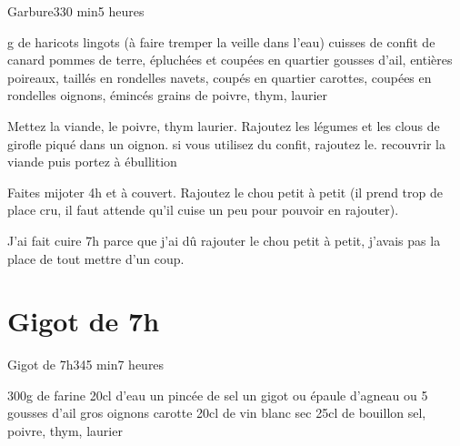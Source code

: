 {\begin{recette}{Garbure}{3}{30 min}{5 heures}
\begin{ingredients}
 g de haricots lingots (à faire tremper la veille dans l’eau) 
 cuisses de confit de canard
 pommes de terre, épluchées et coupées en quartier
 gousses d’ail, entières
 poireaux, taillés en rondelles
 navets, coupés en quartier
 carottes, coupées en rondelles
 oignons, émincés
 grains de poivre, thym, laurier
\end{ingredients}


\begin{preparation}
\etape Mettez la viande, le poivre, thym laurier.
\etape Rajoutez les légumes et les clous de girofle piqué dans un oignon. 
\etape si vous utilisez du confit, rajoutez le.
\etape recouvrir la viande puis portez à ébullition
\end{preparation}

\begin{cuisson}
Faites mijoter 4h et à couvert. Rajoutez le chou petit à petit (il prend trop de place cru, il faut attende qu'il cuise un peu pour pouvoir en rajouter). 

J'ai fait cuire 7h parce que j'ai dû rajouter le chou petit à petit, j'avais pas la place de tout mettre d'un coup.
\end{cuisson}
\end{recette}


\section{Gigot de 7h}
\begin{recette}{Gigot de 7h}{3}{45 min}{7 heures}
\begin{ingredients}
\ingredient 300g de farine
\ingredient 20cl d'eau
\ingredient un pincée de sel
\ingredient[Gigot]
\ingredient un gigot ou épaule d'agneau
 ou 5 gousses d'ail
 gros oignons
 carotte
\ingredient 20cl de vin blanc sec
\ingredient 25cl de bouillon
\ingredient sel, poivre, thym, laurier
\end{ingredients}



\end{recette}}
